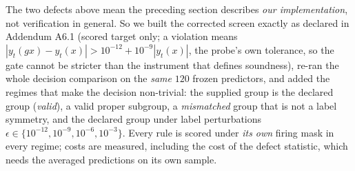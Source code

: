 \documentclass[11pt]{article}
\begin{document}
The two defects above mean the preceding section describes \emph{our implementation}, not
verification in general. So we built the corrected screen exactly as declared in Addendum A6.1
(scored target only; a violation means
$|y_t(gx)-y_t(x)| > 10^{-12} + 10^{-9}|y_t(x)|$, the probe's own tolerance, so the gate cannot
be stricter than the instrument that defines soundness), re-ran the whole decision comparison
on the \emph{same} $120$ frozen predictors, and added the regimes that make the decision
non-trivial: the supplied group is the declared group (\emph{valid}), a valid proper subgroup,
a \emph{mismatched} group that is not a label symmetry, and the declared group under label
perturbations $\epsilon \in \{10^{-12},10^{-9},10^{-6},10^{-3}\}$. Every rule is scored under
\emph{its own} firing mask in every regime; costs are measured, including the cost of the
defect statistic, which needs the averaged predictions on its own sample.
\end{document}
